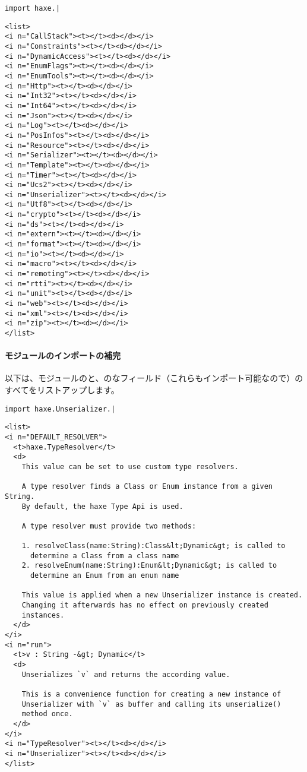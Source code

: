 \begin{lstlisting}
import haxe.|
\end{lstlisting}

\begin{lstlisting}
<list>
<i n="CallStack"><t></t><d></d></i>
<i n="Constraints"><t></t><d></d></i>
<i n="DynamicAccess"><t></t><d></d></i>
<i n="EnumFlags"><t></t><d></d></i>
<i n="EnumTools"><t></t><d></d></i>
<i n="Http"><t></t><d></d></i>
<i n="Int32"><t></t><d></d></i>
<i n="Int64"><t></t><d></d></i>
<i n="Json"><t></t><d></d></i>
<i n="Log"><t></t><d></d></i>
<i n="PosInfos"><t></t><d></d></i>
<i n="Resource"><t></t><d></d></i>
<i n="Serializer"><t></t><d></d></i>
<i n="Template"><t></t><d></d></i>
<i n="Timer"><t></t><d></d></i>
<i n="Ucs2"><t></t><d></d></i>
<i n="Unserializer"><t></t><d></d></i>
<i n="Utf8"><t></t><d></d></i>
<i n="crypto"><t></t><d></d></i>
<i n="ds"><t></t><d></d></i>
<i n="extern"><t></t><d></d></i>
<i n="format"><t></t><d></d></i>
<i n="io"><t></t><d></d></i>
<i n="macro"><t></t><d></d></i>
<i n="remoting"><t></t><d></d></i>
<i n="rtti"><t></t><d></d></i>
<i n="unit"><t></t><d></d></i>
<i n="web"><t></t><d></d></i>
<i n="xml"><t></t><d></d></i>
<i n="zip"><t></t><d></d></i>
</list>
\end{lstlisting}


\paragraph{モジュールのインポートの補完}

以下は、モジュールのと、のなフィールド（これらもインポート可能なので）のすべてをリストアップします。

\begin{lstlisting}
import haxe.Unserializer.|
\end{lstlisting}

\begin{lstlisting}
<list>
<i n="DEFAULT_RESOLVER">
  <t>haxe.TypeResolver</t>
  <d>
    This value can be set to use custom type resolvers.

    A type resolver finds a Class or Enum instance from a given String.
    By default, the haxe Type Api is used.

    A type resolver must provide two methods:

    1. resolveClass(name:String):Class&lt;Dynamic&gt; is called to
      determine a Class from a class name
    2. resolveEnum(name:String):Enum&lt;Dynamic&gt; is called to
      determine an Enum from an enum name

    This value is applied when a new Unserializer instance is created.
    Changing it afterwards has no effect on previously created
    instances.
  </d>
</i>
<i n="run">
  <t>v : String -&gt; Dynamic</t>
  <d>
    Unserializes `v` and returns the according value.

    This is a convenience function for creating a new instance of
    Unserializer with `v` as buffer and calling its unserialize()
    method once.
  </d>
</i>
<i n="TypeResolver"><t></t><d></d></i>
<i n="Unserializer"><t></t><d></d></i>
</list>
\end{lstlisting}


